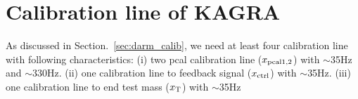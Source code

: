 \section{Calibration line of KAGRA}
As discussed in Section.~\ref{sec:darm_calib}, we need at least four calibration line with following characteristics:
(i) two pcal calibration line ($x_{\rm pcal1,2}$) with $\sim$35Hz and $\sim$330Hz. 
(ii) one calibration line to feedback signal ($x_{\rm ctrl}$) with $\sim$35Hz.
(iii) one calibration line to end test mass ($x_{\rm T}$) with $\sim$35Hz




